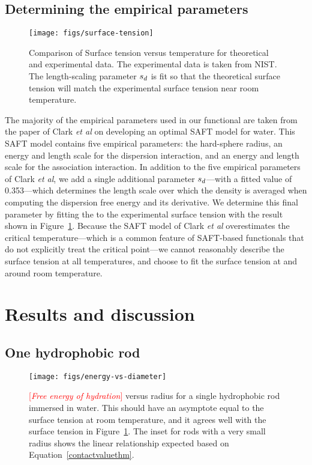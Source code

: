 \documentclass[letterpaper,twocolumn,amsmath,amssymb,prb]{revtex4-1}
\newcommand{\fixme}[1]{\textcolor{red}{[\emph{#1}]}}
\begin{document}
\subsection{Determining the empirical parameters}\label{sec:empirical}

\begin{figure}
\begin{center}
\texttt{[image: figs/surface-tension]}
\end{center}
\caption{Comparison of Surface tension versus temperature for theoretical and
  experimental data. The experimental data is taken from NIST.\cite{nistwater}
  The length-scaling parameter $s_d$ is fit so that the theoretical surface 
  tension will match the experimental surface tension near room temperature.}
\label{fig:surface-tension}
\end{figure}

The majority of the empirical parameters used in our functional are
taken from the paper of Clark \emph{et al} on developing an optimal
SAFT model for water\cite{clark2006developing}.  This SAFT model
contains five empirical parameters: the hard-sphere radius, an energy
and length scale for the dispersion interaction, and an energy and
length scale for the association interaction.  In addition to the five
empirical parameters of Clark \emph{et al}, we add a single additional
parameter $s_d$---with a fitted value of 0.353---which determines
the length scale over which the density is averaged when computing the
dispersion free energy and its derivative.  We determine this final
parameter by fitting the to the experimental surface tension with the
result shown in Figure~\ref{fig:surface-tension}.  Because the SAFT
model of Clark \emph{et al} overestimates the critical
temperature---which is a common feature of SAFT-based functionals that
do not explicitly treat the critical point---we cannot reasonably
describe the surface tension at all temperatures, and choose to fit
the surface tension at and around room temperature.

\section{Results and discussion}

\subsection{One hydrophobic rod}

\begin{figure}
\begin{center}
\texttt{[image: figs/energy-vs-diameter]}
\end{center}
\caption{ \fixme{Free energy of hydration} versus radius for a single hydrophobic rod
immersed in water. This should have an asymptote equal to the surface
tension at room temperature, and it agrees well with the surface tension in
Figure~\ref{fig:surface-tension}. The inset for rods with a very small 
radius shows the linear relationship expected based on 
Equation~\ref{contactvaluethm}.}
\label{fig:energy-vs-diameter}
\end{figure}
\end{document}
